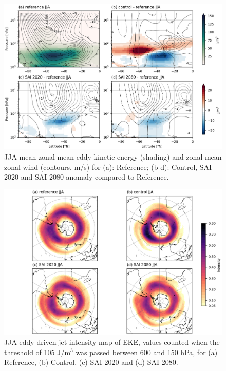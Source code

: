 \begin{figure}[H]
	\centering
	\includegraphics[width=0.95\linewidth]{images/EKE_U_zmdiff_JJA.png}
	\caption{JJA mean zonal-mean eddy kinetic energy (shading) and zonal-mean zonal wind (contours, m/s) for (a): Reference; (b-d): Control, SAI 2020 and SAI 2080 anomaly compared to Reference.}
	\label{fig:EKE_U_zmdiff_JJA}
\end{figure}

\begin{figure}[H]
	\centering
	\includegraphics[width=0.95\linewidth]{images/EDJ_map_JJA.png}
	\caption{JJA eddy-driven jet intensity map of EKE, values counted when the threshold of 105 J/m$^3$ was passed between 600 and 150 hPa, for (a) Reference, (b) Control, (c) SAI 2020 and (d) SAI 2080.}
	\label{fig:EDJ_map_JJA}
\end{figure}

